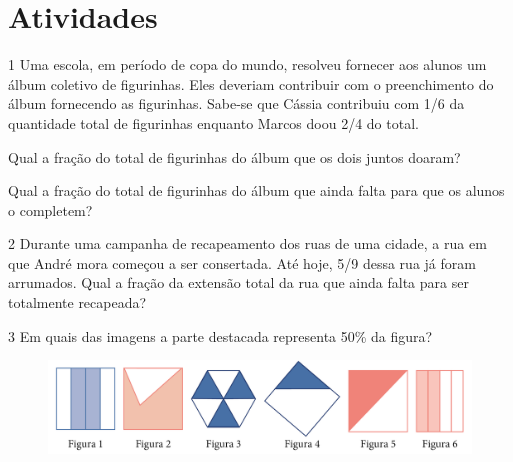 \section{Atividades}

\num{1} Uma escola, em período de copa do mundo, resolveu fornecer aos
alunos um álbum coletivo de figurinhas. Eles deveriam contribuir com o
preenchimento do álbum fornecendo as figurinhas. Sabe-se que Cássia
contribuiu com 1/6 da quantidade total de figurinhas enquanto Marcos doou 2/4 do total.

\begin{escolha}
\item
  Qual a fração do total de figurinhas do álbum que os dois juntos doaram?


\item
  Qual a fração do total de figurinhas do álbum que ainda falta para que os
  alunos o completem?

\end{escolha}


\num{2} Durante uma campanha de recapeamento dos ruas de uma cidade, a rua
em que André mora começou a ser consertada. Até hoje, 5/9 dessa rua já
foram arrumados. Qual a fração da extensão total da rua que ainda falta para ser totalmente recapeada?

\bigskip
\bigskip

\num{3} Em quais das imagens a parte destacada representa 50\% da figura?

\begin{figure}[htpb!]
\includegraphics[width=\textwidth]{../ilustracoes/MAT5/SAEB_5ANO_MAT_figura68.png}
\end{figure}



